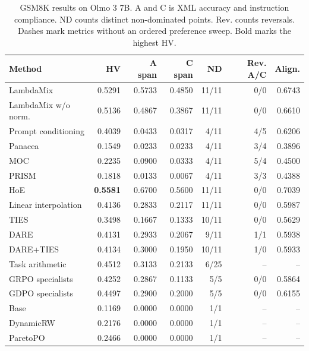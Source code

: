 \begin{table}[htbp]
\centering\small
\setlength{\tabcolsep}{3pt}
\caption{GSM8K results on Olmo 3 7B. A and C is XML accuracy and instruction compliance. ND counts distinct non-dominated points. Rev. counts reversals. Dashes mark metrics without an ordered preference sweep. Bold marks the highest HV.}
\label{tab:full-gsm8k-o7}
\begin{tabular}{@{}lrrrrrr@{}}
\toprule
Method & HV & A span & C span & ND & Rev. A/C & Align.\\
\midrule
LambdaMix & 0.5291 & 0.5733 & 0.4850 & 11/11 & 0/0 & 0.6743\\
LambdaMix w/o norm. & 0.5136 & 0.4867 & 0.3867 & 11/11 & 0/0 & 0.6610\\
\midrule
Prompt conditioning & 0.4039 & 0.0433 & 0.0317 & 4/11 & 4/5 & 0.6206\\
Panacea & 0.1549 & 0.0233 & 0.0233 & 4/11 & 3/4 & 0.3896\\
MOC & 0.2235 & 0.0900 & 0.0333 & 4/11 & 5/4 & 0.4500\\
PRISM & 0.1818 & 0.0133 & 0.0067 & 4/11 & 3/3 & 0.4388\\
HoE & \textbf{0.5581} & 0.6700 & 0.5600 & 11/11 & 0/0 & 0.7039\\
\midrule
Linear interpolation & 0.4136 & 0.2833 & 0.2117 & 11/11 & 0/0 & 0.5987\\
TIES & 0.3498 & 0.1667 & 0.1333 & 10/11 & 0/0 & 0.5629\\
DARE & 0.4131 & 0.2933 & 0.2067 & 9/11 & 1/1 & 0.5938\\
DARE+TIES & 0.4134 & 0.3000 & 0.1950 & 10/11 & 1/0 & 0.5933\\
Task arithmetic & 0.4512 & 0.3133 & 0.2133 & 6/25 & -- & --\\
\midrule
GRPO specialists & 0.4252 & 0.2867 & 0.1133 & 5/5 & 0/0 & 0.5864\\
GDPO specialists & 0.4497 & 0.2900 & 0.2000 & 5/5 & 0/0 & 0.6155\\
\midrule
Base & 0.1169 & 0.0000 & 0.0000 & 1/1 & -- & --\\
DynamicRW & 0.2176 & 0.0000 & 0.0000 & 1/1 & -- & --\\
ParetoPO & 0.2466 & 0.0000 & 0.0000 & 1/1 & -- & --\\
\bottomrule
\end{tabular}
\end{table}

